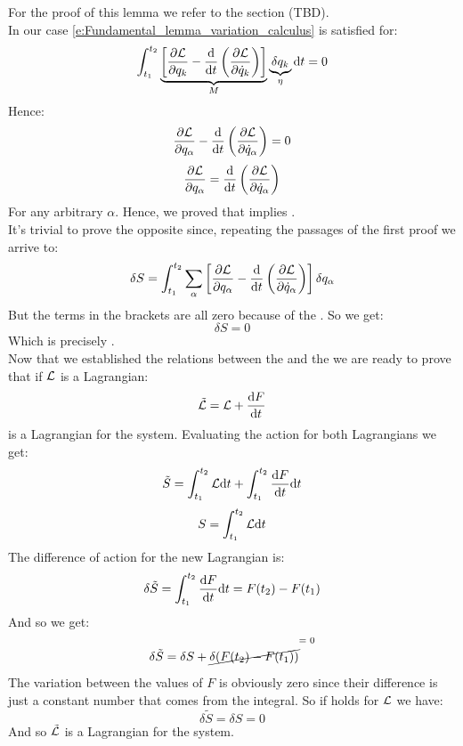 For the proof of this lemma we refer to the section (TBD).\\
In our case \eqref{e:Fundamental_lemma_variation_calculus} is satisfied for:
\begin{equation}
    \int_{t_1}^{t_2}\underbrace{\left[\dfrac{\partial \mathcal{L}}{\partial q_{k}} - \dfrac{\mathrm{d} }{\mathrm{d}t}\left(\dfrac{\partial \mathcal{L}}{\partial \dot{q}_{k}}\right)\right]}_{M} \underbrace{\delta q_{k}}_{\eta} \mathrm{d}t = 0
\end{equation}
Hence:
\begin{equation}
    \dfrac{\partial \mathcal{L}}{\partial q_{\alpha}} - \dfrac{\mathrm{d} }{\mathrm{d}t}\left(\dfrac{\partial \mathcal{L}}{\partial \dot{q}_{\alpha}}\right) = 0
\end{equation}
\begin{equation}
    \dfrac{\partial \mathcal{L}}{\partial q_{\alpha}} = \dfrac{\mathrm{d} }{\mathrm{d}t}\left(\dfrac{\partial \mathcal{L}}{\partial \dot{q}_{\alpha}}\right)
\end{equation}
For any arbitrary $\alpha$. Hence, we proved that \hpquotemath\;implies \eleref.\\
It's trivial to prove the opposite since, repeating the passages of the first proof we arrive to:
\begin{equation}
    \delta S = \int_{t_1}^{t_2}\displaystyle\sum_{\alpha}\left[\dfrac{\partial \mathcal{L}}{\partial q_{\alpha}} - \dfrac{\mathrm{d} }{\mathrm{d}t}\left(\dfrac{\partial \mathcal{L}}{\partial \dot{q}_{\alpha}}\right)\right] \delta q_{\alpha}
\end{equation}
But the terms in the brackets are all zero because of the \eleref. So we get:
\begin{equation}
    \delta S = 0
\end{equation}
Which is precisely \hpquotemath.\\
Now that we established the relations between the \eleref\;and the \hpquotemath\;we are ready to prove that if $\mathcal{L}$ is a Lagrangian:
\begin{equation}
    \tilde{\mathcal{L}} = \mathcal{L} + \dfrac{\mathrm{d}F}{\mathrm{d}t}
\end{equation}
is a Lagrangian for the system. Evaluating the action for both Lagrangians we get:
\begin{equation}
    \tilde{S} = \int_{t_1}^{t_2}\mathcal{L} \mathrm{d}t + \int_{t_1}^{t_2}\dfrac{\mathrm{d}F}{\mathrm{d}t} \mathrm{d}t
\end{equation}
\begin{equation}
    S = \int_{t_1}^{t_2}\mathcal{L} \mathrm{d}t
\end{equation}
The difference of action for the new Lagrangian is:
\begin{equation}
    \delta \tilde{S} = \int_{t_1}^{t_2}\dfrac{\mathrm{d}F}{\mathrm{d}t} \mathrm{d}t = F(t_2) - F(t_1)
\end{equation}
And so we get:
\begin{equation}
    \delta \tilde{S} = \delta S + \crossout{\delta(F(t_2) - F(t_1))}
\end{equation}
The variation between the values of $F$ is obviously zero since their difference is just a constant number that comes from the integral. So if \hpquotemath\;holds for $\mathcal{L}$ we have:
\begin{equation}
    \delta \tilde{S} = \delta S = 0
\end{equation}
And so $\tilde{\mathcal{L}}$ is a Lagrangian for the system.\\
